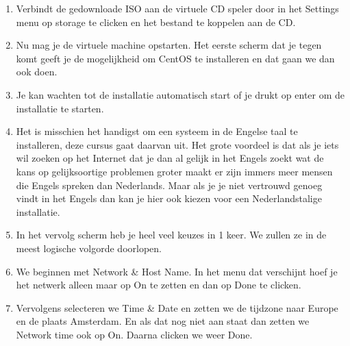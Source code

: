 \begin{enumerate}
	\item
		\begin{minipage}[t]{\linewidth}
		\raggedright
		Verbindt de gedownloade ISO aan de virtuele CD speler door in het Settings menu op storage te clicken en het bestand te koppelen aan de CD.
		\end{minipage}
	\item Nu mag je de virtuele machine opstarten. Het eerste scherm dat je tegen komt geeft je de mogelijkheid om CentOS te installeren en dat gaan we dan ook doen.
	\item
		\begin{minipage}[t]{\linewidth}
		\raggedright
		Je kan wachten tot de installatie automatisch start of je drukt op enter om de installatie te starten.
		\end{minipage}
	\item
		\begin{minipage}[t]{\linewidth}
		\raggedright
		Het is misschien het handigst om een systeem in de Engelse taal te installeren, deze cursus gaat daarvan uit. Het grote voordeel is dat als je iets wil zoeken op het Internet dat je dan al gelijk in het Engels zoekt wat de kans op gelijksoortige problemen groter maakt er zijn immers meer mensen die Engels spreken dan Nederlands. Maar als je je niet vertrouwd genoeg vindt in het Engels dan kan je hier ook kiezen voor een Nederlandstalige installatie.
		\end{minipage}
	\item
		\begin{minipage}[t]{\linewidth}
		\raggedright
		In het vervolg scherm heb je heel veel keuzes in 1 keer. We zullen ze in de meest logische volgorde doorlopen.
		\end{minipage}
	\item We beginnen met Network \& Host Name. In het menu dat verschijnt hoef je het netwerk alleen maar op On te zetten en dan op Done te clicken.
	\item Vervolgens selecteren we Time \& Date en zetten we de tijdzone naar Europe en de plaats Amsterdam. En als dat nog niet aan staat dan zetten we Network time ook op On. Daarna clicken we weer Done.

\end{enumerate}
